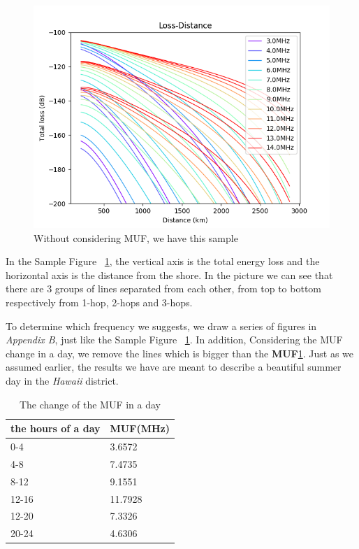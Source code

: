 \documentclass{mcmthesis}
\begin{document}
      \begin{figure}[h]
      \centering
      \includegraphics[scale=0.6]{Sample}
      \caption{Without considering MUF, we have this sample}
      \label{fig:Sample}
      \end{figure}

      In the Sample Figure ~\ref{fig:Sample}, the vertical axis is the total energy loss and the horizontal axis is the distance from the shore. In the picture we can see that there are 3 groups of lines separated from each other, from top to bottom respectively from 1-hop, 2-hops and 3-hops.

      To determine which frequency we suggests, we draw a series of figures in \emph{Appendix B}, just like the Sample Figure ~\ref{fig:Sample}. In addition, Considering the MUF change in a day, we remove the lines which is bigger than the \textbf{MUF}\ref{tab: MUF in HAWAII}. Just as we assumed earlier, the results we have are meant to describe a beautiful summer day in the \emph{Hawaii} district.

      \begin{table}[]
          \centering
          \caption{The change of the MUF in a day}
          \label{tab: MUF in HAWAII}
          \begin{tabular}{|l|l|}
          \hline
          the hours of a day & MUF(MHz) \\ \hline
          0-4                & 3.6572   \\ \hline
          4-8                & 7.4735   \\ \hline
          8-12               & 9.1551   \\ \hline
          12-16              & 11.7928  \\ \hline
          12-20              & 7.3326   \\ \hline
          20-24              & 4.6306   \\ \hline
          \end{tabular}
      \end{table}
\end{document}
